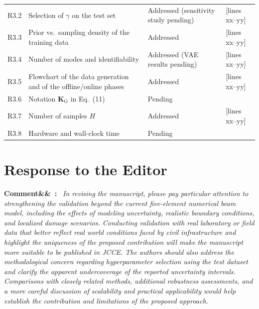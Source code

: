 \documentclass[11pt]{article}
\newenvironment{rcomment}[1]{\par\bigskip\noindent\textbf{Comment\ifx&#1&\else\ #1\fi:}\ \itshape}{\par}
\newcommand{\tbd}[1]{\textcolor{note}{\textsf{[#1]}}}
\newcommand{\lines}[1]{\tbd{lines #1}}
\begin{document}
{\begin{longtable}{p{1.55cm}p{6.0cm}p{3.0cm}p{3.6cm}}
R3.2 & Selection of $\gamma$ on the test set & Addressed (sensitivity study pending) & \lines{xx--yy} \\
R3.3 & Prior vs.\ sampling density of the training data & Addressed & \lines{xx--yy} \\
R3.4 & Number of modes and identifiability & Addressed (VAE results pending) & \lines{xx--yy} \\
R3.5 & Flowchart of the data generation and of the offline/online phases & Addressed & \lines{xx--yy} \\
R3.6 & Notation $\mathbf{K}_{\mathrm{G}}$ in Eq.~(11) & Pending & \\
R3.7 & Number of samples $H$ & Addressed & \lines{xx--yy} \\
R3.8 & Hardware and wall-clock time & Pending & \\
\bottomrule
\end{longtable}
}

\section{Response to the Editor}

\begin{rcomment}{}
In revising the manuscript, please pay particular attention to strengthening the validation beyond the current
five-element numerical beam model, including the effects of modeling uncertainty, realistic boundary conditions, and
localized damage scenarios. Conducting validation with real laboratory or field data that better reflect real world
conditions faced by civil infrastructure and highlight the uniqueness of the proposed contribution will make the
manuscript more suitable to be published in JCCE. The authors should also address the methodological concern regarding
hyperparameter selection using the test dataset and clarify the apparent undercoverage of the reported uncertainty
intervals. Comparisons with closely related methods, additional robustness assessments, and a more careful discussion of
scalability and practical applicability would help establish the contribution and limitations of the proposed approach.
\end{rcomment}
\end{document}
